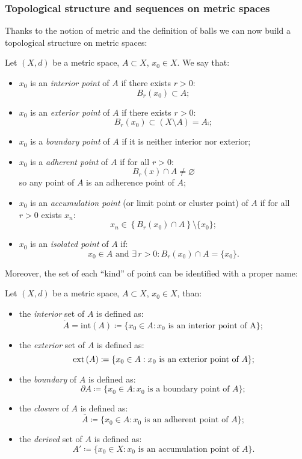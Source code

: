 \subsubsection{Topological structure and sequences on metric spaces}

Thanks to the notion of metric and the definition of balls we can now build a topological structure on metric spaces:
\begin{defn} \label{topological-structure-metric-spaces}
	Let $\left(X,d\right)$ be a metric space, $A\subset X$, $x_0 \in X$. We say that:
	\begin{itemize}
		\item $x_0$ is an \emph{interior point} of $A$ if there exists $r > 0$:	
			$$
			B_r\left(x_0\right)\subset A
			;
			$$%
		\item $x_0$ is an \emph{exterior point} of $A$ if there exists $r>0$:
			$$
			B_r\left(x_0\right)
			\subset \left(X \setminus A\right) 
			= A\comp
			;
			$$
		\item $x_0$ is a \emph{boundary point} of $A$ if it is neither interior nor exterior;
		\item $x_0$ is a \emph{adherent point} of $A$ if for all $r>0$:
			$$
			B_r\left(x\right)\cap A 
			\neq \varnothing
			$$
			so any point of $A$ is an adherence point of $A$;
		\item $x_0$ is an \emph{accumulation point} (or limit point or cluster point) of $A$ if for all $r>0$ exists $x_n$:
			$$
			x_n 
			\in \left\{B_r (x_0) \cap A\right\}\setminus\{x_0\}
			;
			$$
		\item $x_0$ is an \emph{isolated point} of $A$ if:
			$$
			x_0 
			\in A
			\text{ and }
			\exists \, r>0 : 
			B_r\left(x_0\right)\cap A
			=\{x_0\}
			.
			$$
	\end{itemize}
\end{defn}

Moreover, the set of each ``kind'' of point can be identified with a proper name:
\begin{defn} \label{notable-set-portions}
	Let $\left(X,d\right)$ be a metric space, $A\subset X$, $x_0 \in X$, than:
	\begin{itemize}
		\item the \emph{interior} set of $A$ is defined as:
					$$\mathring{A} = \text{int}\left(A\right) \coloneqq \{x_0 \in A : x_0 \text{ is an interior point of A}\};$$
		\item the \emph{exterior} set of $A$ is defined as:
					$$\operatorname{ext}\left(A\right) \coloneqq \{x_0 \in A: x_0\text{ is an exterior point of }A\};$$
		\item the \emph{boundary} of $A$ is defined as:
					$$\partial A \coloneqq \{x_0 \in A: x_0\text{ is a boundary point of }A\};$$
		\item the \emph{closure} of $A$ is defined as:
					$$\bar{A} \coloneqq \{x_0 \in A: x_0\text{ is an adherent point of }A\};$$
		\item the \emph{derived} set of $A$ is defined as:
					$$A'\coloneqq \{x_0 \in X: x_0\text{ is an accumulation point of }A\}.$$
	\end{itemize}
\end{defn}


